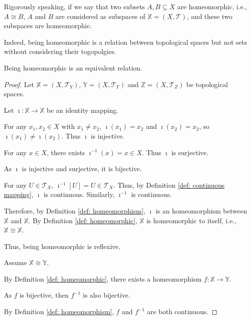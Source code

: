 \begin{note}
	Rigorously speaking, if we say that two subsets $A, B \subseteq X$ are homeomorphic, i.e., $A \cong B$, $A$ and $B$ are considered as subspaces of $\mathbb X = (X, \mathcal T)$, and these two subspaces are homeomorphic.
	
	Indeed, being homeomorphic is a relation between topological spaces but not sets without considering their togopolgies.
\end{note}


\begin{proposition}
	Being homeomorphic is an equivalent relation.
	
	\begin{proof}
		Let $\mathbb X = (X, \mathcal T_Y)$, $\mathbb Y = (X, \mathcal T_Y)$ and $\mathbb Z = (X, \mathcal T_Z)$ be topological spaces.

		Let $\imath: \mathbb X \to \mathbb X$ be an identity mapping.
		
		For any $x_1, x_2 \in X$ with $x_1 \ne x_2$, $\imath(x_1) = x_2$ and $\imath (x_2) = x_2$, so $\imath (x_1) \ne \imath(x_2)$. Thus $\imath$ is injective.
		
		For any $x \in X$, there exists $\imath^{-1}(x) = x \in X$. Thus $\imath$ is surjective.
		
		As $\imath$ is injective and surjective, it is bijective.
	
		For any $U \in \mathcal T_X$, $\imath^{-1}[U] = U \in \mathcal T_X$. Thus, by Definition \ref{def: continuous mapping}, $\imath$ is continuous. Similarly, $\imath^{-1}$ is continuous.
		
		Therefore, by Definition \ref{def: homeomorphism}, $\imath$ is an homeomorphism between $\mathbb X$ and $\mathbb X$. By Definition \ref{def: homeomorphic}, $\mathbb X$ is homeomorphic to itself, i.e., $\mathbb X \cong \mathbb X$.
		
		Thus, being homeomorphic is reflexive.
		
		\qedlm
				
		Assume $\mathbb X \cong \mathbb Y$.
		
		By Definition \ref{def: homeomorphic}, there exists a homeomorphism $f: \mathbb X \to \mathbb Y$.
		
		As $f$ is bijective, then $f^{-1}$ is also bijective.
		
		By Definition \ref{def: homeomorphism}, $f$ and $f^{-1}$ are both continuous.
		

\end{proof}
\end{proposition}
